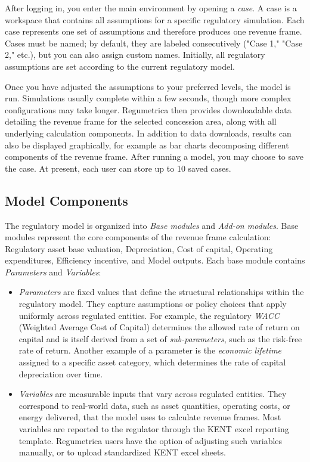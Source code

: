 After logging in, you enter the main environment by opening a \emph{case}. A case is a workspace that contains all assumptions for a specific regulatory simulation. Each case represents one set of assumptions and therefore produces one revenue frame. Cases must be named; by default, they are labeled consecutively ("Case 1," "Case 2," etc.), but you can also assign custom names. Initially, all regulatory assumptions are set according to the current regulatory model.

Once you have adjusted the assumptions to your preferred levels, the model is run. Simulations usually complete within a few seconds, though more complex configurations may take longer. Regumetrica then provides downloadable data detailing the revenue frame for the selected concession area, along with all underlying calculation components. In addition to data downloads, results can also be displayed graphically, for example as bar charts decomposing different components of the revenue frame. After running a model, you may choose to save the case. At present, each user can store up to 10 saved cases.

\subsection*{Model Components}
The regulatory model is organized into \emph{Base modules} and \emph{Add-on modules}. Base modules represent the core components of the revenue frame calculation: Regulatory asset base valuation, Depreciation, Cost of capital, Operating expenditures, Efficiency incentive, and Model outputs. Each base module contains \emph{Parameters} and \emph{Variables}:

\begin{itemize}
  \item \emph{Parameters} are fixed values that define the structural relationships within the regulatory model. They capture assumptions or policy choices that apply uniformly across regulated entities. For example, the regulatory \emph{WACC} (Weighted Average Cost of Capital) determines the allowed rate of return on capital and is itself derived from a set of \emph{sub-parameters}, such as the risk-free rate of return. Another example of a parameter is the \emph{economic lifetime} assigned to a specific asset category, which determines the rate of capital depreciation over time. 

  \item \emph{Variables} are measurable inputs that vary across regulated entities. They correspond to real-world data, such as asset quantities, operating costs, or energy delivered, that the model uses to calculate revenue frames. Most variables are reported to the regulator through the KENT excel reporting template. Regumetrica users have the option of adjusting such variables manually, or to upload standardized KENT excel sheets. 
\end{itemize}


